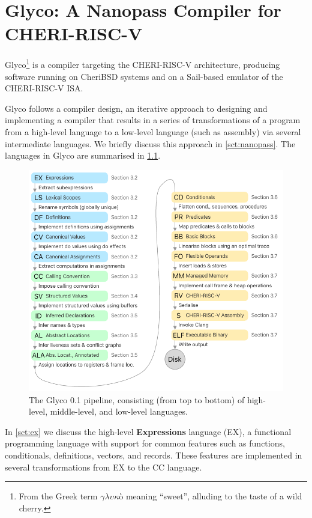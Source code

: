 \documentclass[main.tex]{subfiles}
\begin{document}
\onlyinsubfile{\mainmatter{}}

\chapter{Glyco: A Nanopass Compiler for CHERI-RISC-V} \label{ch:glyco}
Glyco\footnote{From the Greek term $\gamma\lambda\upsilon\kappa{}\text{ò}$ meaning \enquote{sweet}, alluding to the taste of a wild cherry.} is a compiler targeting the CHERI-RISC-V architecture, producing software running on CheriBSD systems and on a Sail-based emulator of the CHERI-RISC-V ISA.

Glyco follows a  compiler design, an iterative approach to designing and implementing a compiler that results in a series of transformations of a program from a high-level language to a low-level language (such as assembly) via several intermediate languages. We briefly discuss this approach in \cref{sct:nanopass}. The languages in Glyco are summarised in \cref{fig:pipeline01}.

\begin{figure}
	\centering
	\includegraphics{Images/Pipeline v0.1.pdf}
	\caption{The Glyco 0.1 pipeline, consisting (from top to bottom) of high-level, middle-level, and low-level languages.}
	\label{fig:pipeline01}
\end{figure}

In \cref{sct:ex} we discuss the high-level \textbf{Expressions} language (EX), a functional programming language with support for common features such as functions, conditionals, definitions, vectors, and records. These features are implemented in several transformations from EX to the CC language.
\end{document}
